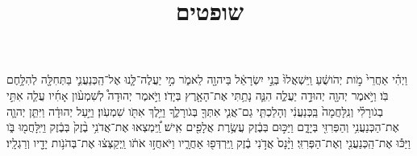 \documentclass{openreader}
\title{שופטים}
\date{}
\begin{document}
\maketitle
\raggedbottom 
\fontsize{16pt}{24pt}\selectfont


וַיְהִ֗י אַחֲרֵי֙ מֹ֣ות יְהֹושֻׁ֔עַ וַֽיִּשְׁאֲלוּ֙ בְּנֵ֣י יִשְׂרָאֵ֔ל בַּיהוָ֖ה לֵאמֹ֑ר מִ֣י יַעֲלֶה־לָּ֧נוּ אֶל־הַֽכְּנַעֲנִ֛י בַּתְּחִלָּ֖ה לְהִלָּ֥חֶם בֹּֽו׃ 
וַיֹּ֣אמֶר יְהוָ֖ה יְהוּדָ֣ה יַעֲלֶ֑ה הִנֵּ֛ה נָתַ֥תִּי אֶת־הָאָ֖רֶץ בְּיָדֹֽו׃ 
וַיֹּ֣אמֶר יְהוּדָה֩ לְשִׁמְעֹ֨ון אָחִ֜יו עֲלֵ֧ה אִתִּ֣י בְגֹורָלִ֗י וְנִֽלָּחֲמָה֙ בַּֽכְּנַעֲנִ֔י וְהָלַכְתִּ֧י גַם־אֲנִ֛י אִתְּךָ֖ בְּגֹורָלֶ֑ךָ וַיֵּ֥לֶךְ אִתֹּ֖ו שִׁמְעֹֽון׃ 
וַיַּ֣עַל יְהוּדָ֔ה וַיִּתֵּ֧ן יְהוָ֛ה אֶת־הַכְּנַעֲנִ֥י וְהַפְּרִזִּ֖י בְּיָדָ֑ם וַיַּכּ֣וּם בְּבֶ֔זֶק עֲשֶׂ֥רֶת אֲלָפִ֖ים אִֽישׁ׃ 
וַֽ֠יִּמְצְאוּ אֶת־אֲדֹנִ֥י בֶ֨זֶק֙ בְּבֶ֔זֶק וַיִּֽלָּחֲמ֖וּ בֹּ֑ו וַיַּכּ֕וּ אֶת־הַֽכְּנַעֲנִ֖י וְאֶת־הַפְּרִזִּֽי׃ 
וַיָּ֨נָס֙ אֲדֹ֣נִי בֶ֔זֶק וַֽיִּרְדְּפ֖וּ אַחֲרָ֑יו וַיֹּאחֲז֣וּ אֹתֹ֔ו וַֽיְקַצְּצ֔וּ אֶת־בְּהֹנֹ֥ות יָדָ֖יו וְרַגְלָֽיו׃ 
\end{document}
